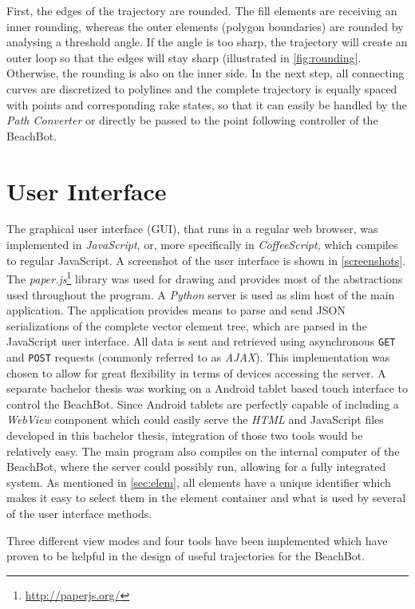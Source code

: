 First, the edges of the trajectory are rounded. The fill elements are receiving an inner rounding, whereas the outer elements (polygon boundaries) are rounded by analysing a threshold angle. If the angle is too sharp, the trajectory will create an outer loop so that the edges will stay sharp (illustrated in \autoref{fig:rounding}. Otherwise, the rounding is also on the inner side. In the next step, all connecting curves are discretized to polylines and the complete trajectory is equally spaced with points and corresponding rake states, so that it can easily be handled by the \textit{Path Converter} or directly be passed to the point following controller of the BeachBot.

\section{User Interface}

The graphical user interface (GUI), that runs in a regular web browser, was implemented in \textit{JavaScript}, or, more specifically in \textit{CoffeeScript}, which compiles to regular JavaScript. A screenshot of the user interface is shown in \autoref{screenshots}. The \textit{paper.js}\footnote{\url{http://paperjs.org/}} library was used for drawing and provides most of the abstractions used throughout the program. A \textit{Python} server is used as slim host of the main application. The application provides means to parse and send JSON serializations of the complete vector element tree, which are parsed in the JavaScript user interface. All data is sent and retrieved using asynchronous \texttt{GET} and \texttt{POST} requests (commonly referred to as \textit{AJAX}). This implementation was chosen to allow for great flexibility in terms of devices accessing the server. A separate bachelor thesis was working on a Android tablet based touch interface to control the BeachBot. Since Android tablets are perfectly capable of including a \textit{WebView} component which could easily serve the \textit{HTML} and JavaScript files developed in this bachelor thesis, integration of those two tools would be relatively easy. The main program also compiles on the internal computer of the BeachBot, where the server could possibly run, allowing for a fully integrated system. As mentioned in \autoref{sec:elem}, all elements have a unique identifier which makes it easy to select them in the element container and what is used by several of the user interface methods.

Three different view modes and four tools have been implemented which have proven to be helpful in the design of useful trajectories for the BeachBot.

